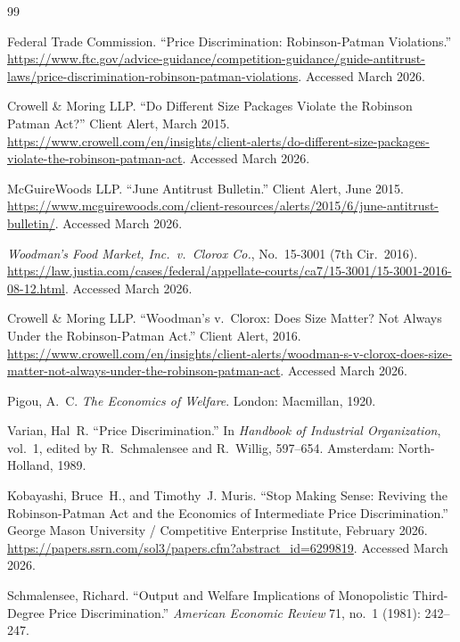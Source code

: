 \documentclass[12pt]{article}
\theoremstyle{definition}
\begin{document}
\newpage
\begin{thebibliography}{99}

Federal Trade Commission.
``Price Discrimination: Robinson-Patman Violations.''
\url{https://www.ftc.gov/advice-guidance/competition-guidance/guide-antitrust-laws/price-discrimination-robinson-patman-violations}. Accessed March 2026.

Crowell \& Moring LLP.
``Do Different Size Packages Violate the Robinson Patman Act?''
Client Alert, March 2015.
\url{https://www.crowell.com/en/insights/client-alerts/do-different-size-packages-violate-the-robinson-patman-act}.
Accessed March 2026.

McGuireWoods LLP.
``June Antitrust Bulletin.''
Client Alert, June 2015.
\url{https://www.mcguirewoods.com/client-resources/alerts/2015/6/june-antitrust-bulletin/}.
Accessed March 2026.

\textit{Woodman's Food Market, Inc.\ v.\ Clorox Co.}, No.\ 15-3001 (7th Cir.\ 2016).
\url{https://law.justia.com/cases/federal/appellate-courts/ca7/15-3001/15-3001-2016-08-12.html}.
Accessed March 2026.

Crowell \& Moring LLP.
``Woodman's v.\ Clorox: Does Size Matter? Not Always Under the Robinson-Patman Act.''
Client Alert, 2016.
\url{https://www.crowell.com/en/insights/client-alerts/woodman-s-v-clorox-does-size-matter-not-always-under-the-robinson-patman-act}.
Accessed March 2026.

Pigou, A.~C.
\textit{The Economics of Welfare}.
London: Macmillan, 1920.

Varian, Hal~R.
``Price Discrimination.''
In \textit{Handbook of Industrial Organization}, vol.~1, edited by R.~Schmalensee and R.~Willig, 597--654.
Amsterdam: North-Holland, 1989.

Kobayashi, Bruce~H., and Timothy~J. Muris.
``Stop Making Sense: Reviving the Robinson-Patman Act and the Economics of Intermediate Price Discrimination.''
George Mason University / Competitive Enterprise Institute, February 2026.
\url{https://papers.ssrn.com/sol3/papers.cfm?abstract_id=6299819}.
Accessed March 2026.

Schmalensee, Richard.
``Output and Welfare Implications of Monopolistic Third-Degree Price Discrimination.''
\textit{American Economic Review} 71, no.~1 (1981): 242--247.


\end{thebibliography}
\end{document}
